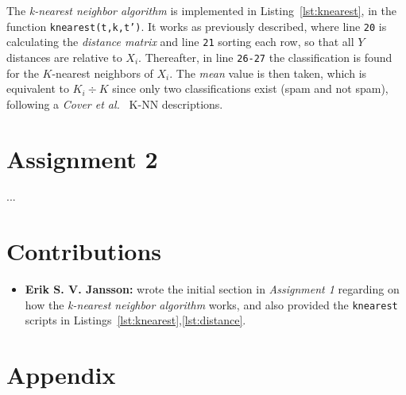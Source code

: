 \documentclass[a4paper, twocolumn]{article}
\begin{document}
    The \emph{k-nearest neighbor algorithm} is implemented in Listing~\ref{lst:knearest}, in the function \texttt{knearest(t,k,t')}. It works as previously described, where line \texttt{20} is calculating the \emph{distance matrix} and line \texttt{21} sorting each row, so that all $Y$ distances are relative to $X_i$. Thereafter, in line \texttt{26-27} the classification is found for the $K$-nearest neighbors of $X_i$. The \emph{mean} value is then taken, which is equivalent to $K_i \div K$ since only two classifications exist (spam and not spam), following a \emph{Cover et al.}~\cite{cover1967nearest} K-NN descriptions.

    \section*{Assignment 2}

    ...

    \section*{Contributions}

    \begin{itemize}
        \item{\textbf{Erik S. V. Jansson:} wrote the initial section in \emph{Assignment 1} regarding on how the \emph{k-nearest neighbor algorithm} works, and also provided the \texttt{knearest} scripts in Listings~\ref{lst:knearest},\ref{lst:distance}.}
    \end{itemize}

    \nocite{*} %
    
    
    \onecolumn \appendix
    \section*{Appendix}

    
    
\end{document}
